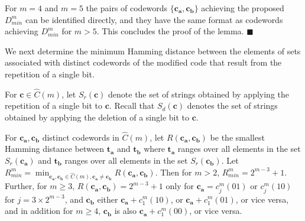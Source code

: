 
For $m=4$ and $m=5$ the pairs of codewords
$\{\mathbf{c_a},\mathbf{c_b}\}$ achieving the proposed $D_{min}^m$
can be identified directly, and they have the same format as
codewords achieving $D_{min}^m$ for $m > 5$. This concludes the
proof of the lemma. \hfill$\blacksquare$

We next determine the minimum Hamming distance
between the elements of sets associated with distinct codewords of
the modified code that result from the
repetition of a single bit.

For $\mathbf{c} \in \hat{C}(m)$, let $S_r(\mathbf{c})$ denote the
set of strings obtained by applying the repetition
of a single bit to $\mathbf{c}$. Recall that $S_d(\mathbf{c})$ denotes the set of strings
obtained by
applying the deletion of a single bit to $\mathbf{c}$.

\begin{lemma}\label{LE1a}
For $\mathbf{c_a},\mathbf{c_b}$ distinct codewords in
$\hat{C}(m)$, let $R(\mathbf{c_a},\mathbf{c_b})$ be the smallest
Hamming distance between $\mathbf{t_a}$ and $\mathbf{t_b}$ where
$\mathbf{t_a}$ ranges over all elements in the set
$S_r(\mathbf{c_a})$ and $\mathbf{t_b}$ ranges over all elements in
the set $S_r(\mathbf{c_b})$. Let
$R_{min}^m=\min_{\mathbf{c_a},\mathbf{c_b} \in \hat{C}(m),
\mathbf{c_a}\neq \mathbf{c_b}} R(\mathbf{c_a},\mathbf{c_b})$. Then
for $m>2$, $R_{min}^m=2^{m-3}+1$. Further, for $m \ge 3$,
$R(\mathbf{c_a},\mathbf{c_b})=2^{m-3}+1$ only for
$\mathbf{c_a}=c_j^m(01)$ or $c_j^m(10)$ for $j=3 \times 2^{m-3}$,
and $\mathbf{c_b}$ either $\mathbf{c_a}+c_1^m(10)$, or
$\mathbf{c_a}+c_1^m(01)$, or vice versa, and in addition for $m
\geq 4$, $\mathbf{c_b}$ is also $\mathbf{c_a}+c_1^m(00)$, or vice
versa.
\end{lemma}

